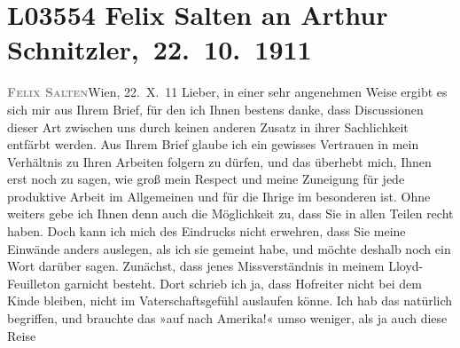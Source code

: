 

\section[ Felix Salten an Arthur Schnitzler, 22. 10. 1911]{L03554 Felix Salten an Arthur Schnitzler, 22. 10. 1911}
\nopagebreak{}
\rehead{ }\normalsize\beginnumbering{}
\toendnotes[C]{\smallbreak\pagebreak[2]}
\toendnotes[C]{\smallbreak}
\pstart
           {\pb}\textcolor{gray}{\textbf{\textsc{Felix Salten}}}\hfill Wien, 22. X. 11\pend
           \vspace{0.5em}
\pstart
           Lieber, in einer sehr angenehmen Weise ergibt es sich mir aus Ihrem
               Brief, für den ich Ihnen bestens danke, dass Discussionen dieser Art zwischen uns
               durch keinen anderen Zusatz in ihrer Sachlichkeit entfärbt werden. Aus Ihrem Brief
               glaube ich ein gewisses Vertrauen in mein Verhältnis zu Ihren Arbeiten folgern zu
               dürfen, und das überhebt mich, Ihnen erst noch zu sagen, wie groß mein Respect und
               meine Zuneigung für jede produktive Arbeit im Allgemeinen und für die Ihrige im
               besonderen ist. Ohne weiters gebe ich Ihnen denn auch die Möglichkeit zu, dass Sie in
               allen Teilen recht haben. Doch kann ich mich des Eindrucks nicht erwehren, dass Sie
               meine Einwände anders auslegen, als ich sie gemeint habe, und möchte deshalb noch ein
               Wort darüber sagen. Zunächst, dass jenes Missverständnis in meinem Lloyd-Feuilleton garnicht besteht. Dort
               schrieb ich ja, dass Hofreiter
               nicht bei dem Kinde bleiben, nicht im Vaterschaftsgefühl auslaufen könne. Ich hab das
               natürlich begriffen, und brauchte das »auf nach Amerika!« umso weniger, als ja auch diese Reise
